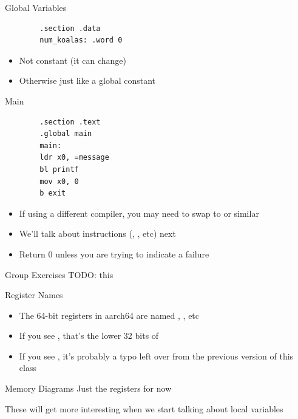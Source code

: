 \begin{frame}[fragile]{Global Variables}
	\begin{verbatim}
		.section .data
		num_koalas: .word 0
		\end{verbatim}
	\begin{itemize}
		\item Not constant (it can change)
		\item Otherwise just like a global constant
	\end{itemize}
\end{frame}

\begin{frame}[fragile]{Main}
	\begin{verbatim}
		.section .text
		.global main
		main:
		ldr x0, =message
		bl printf
		mov x0, 0
		b exit
		\end{verbatim}
	\begin{itemize}
		\item If using a different compiler, you may need to swap  to  or similar
		\item We'll talk about instructions (, , etc) next
		\item Return 0 unless you are trying to indicate a failure
	\end{itemize}
\end{frame}

\begin{frame}{Group Exercises}
TODO: this
\end{frame}


\begin{frame}{Register Names}
	\begin{itemize}
		\item The 64-bit registers in aarch64 are named , , etc
		\item If you see , that's the lower 32 bits of 
		\item If you see , it's probably a typo left over from the previous version of this class
	\end{itemize}
\end{frame}

\begin{frame}{Memory Diagrams}
Just the registers for now

These will get more interesting when we start talking about local variables
\end{frame}

